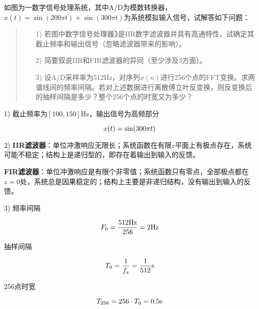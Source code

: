 \documentclass[cn, hazy, blue, normal, 14pt]{elegantnote}
\begin{document}
\begin{exercise}

如图为一数字信号处理系统，其中A/D为模数转换器，$x(t)=\sin(200\pi t)+\sin(300\pi t)$为系统模拟输入信号，试解答如下问题：

\begin{center}
\end{center}

\begin{quote}
\begin{itemize}
    \item[1)] 若图中数字信号处理器\textcircled{1}是IIR数字滤波器并具有高通特性，试确定其截止频率和输出信号（忽略滤波器带来的影响）。
    \item[2)] 简要叙说IIR和FIR滤波器的异同（至少涉及3方面）。
    \item[3)] 设A/D采样率为512Hz，对序列$x(n)$进行256个点的FFT变换。求两谱线间的频率间隔。若对上述数据进行离散傅立叶反变换，则反变换后的抽样间隔是多少？整个256个点的时宽又为多少？
\end{itemize}
\end{quote}

\end{exercise}

\begin{solution}[print=true]

1) 截止频率为$[100, 150]$Hz，输出信号为高频部分

\begin{equation}
\notag
    x(t)=\sin(300\pi t)
\end{equation}

2) \textbf{IIR滤波器}：单位冲激响应无限长；系统函数在有限$z$平面上有极点存在，系统可能不稳定；结构上是递归型的，即存在着输出到输入的反馈。

\textbf{FIR滤波器}：单位冲激响应是有限个非零值；系统函数只有零点，全部极点都在$z=0$处，系统总是因果稳定的；结构上主要是非递归结构，没有输出到输入的反馈。

3) 频率间隔

\begin{equation}
\notag
    F_0=\frac{512\text{Hz}}{256}=2\text{Hz}
\end{equation}

抽样间隔

\begin{equation}
\notag
    T_0=\frac{1}{f_s}=\frac{1}{512}\text{s}
\end{equation}

256点时宽

\begin{equation}
\notag
    T_{256}=256\cdot T_0=0.5\text{s}
\end{equation}

\end{solution}
\end{document}
